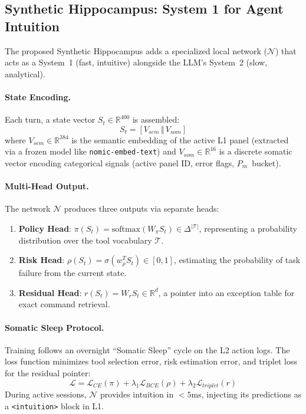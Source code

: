 \documentclass[11pt,a4paper]{article}
\newcommand{\Pm}{\ensuremath{P_m}}
\begin{document}
\subsection{Synthetic Hippocampus: System 1 for Agent Intuition}

The proposed Synthetic Hippocampus adds a specialized local network
($\mathcal{N}$) that acts as a System~1 (fast, intuitive) alongside
the LLM's System~2 (slow, analytical).

\paragraph{State Encoding.}
Each turn, a state vector $S_t \in \mathbb{R}^{400}$ is assembled:
\begin{equation}
  S_t = [V_{sem} \, \Vert \, V_{som}]
\end{equation}
where $V_{sem} \in \mathbb{R}^{384}$ is the semantic embedding of the
active L1 panel (extracted via a frozen model like \texttt{nomic-embed-text})
and $V_{som} \in \mathbb{R}^{16}$ is a discrete somatic vector encoding
categorical signals (active panel ID, error flags, \Pm\ bucket).

\paragraph{Multi-Head Output.}
The network $\mathcal{N}$ produces three outputs via separate heads:
\begin{enumerate}
  \item \textbf{Policy Head}: $\pi(S_t) = \text{softmax}(W_\pi S_t) \in \Delta^{|\mathcal{T}|}$,
        representing a probability distribution over the tool vocabulary $\mathcal{T}$.
  \item \textbf{Risk Head}: $\rho(S_t) = \sigma(w_\rho^T S_t) \in [0, 1]$,
        estimating the probability of task failure from the current state.
  \item \textbf{Residual Head}: $r(S_t) = W_r S_t \in \mathbb{R}^d$,
        a pointer into an exception table for exact command retrieval.
\end{enumerate}

\paragraph{Somatic Sleep Protocol.}
Training follows an overnight ``Somatic Sleep'' cycle on the L2 action
logs.
The loss function minimizes tool selection error, risk estimation error,
and triplet loss for the residual pointer:
\begin{equation}
  \mathcal{L} = \mathcal{L}_{CE}(\pi) + \lambda_1 \mathcal{L}_{BCE}(\rho) + \lambda_2 \mathcal{L}_{triplet}(r)
\end{equation}
During active sessions, $\mathcal{N}$ provides intuition in $<5$ms,
injecting its predictions as a \texttt{<intuition>} block in L1.
\end{document}
